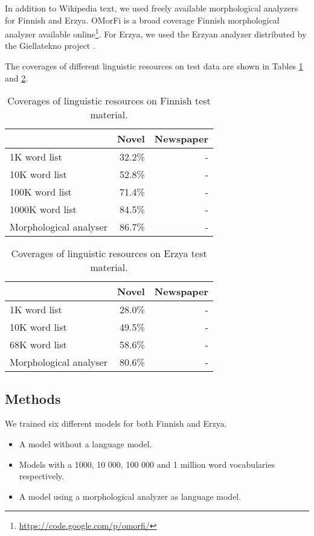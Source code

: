\documentclass[b5paper]{article}
\begin{document}
In addition to Wikipedia text, we used freely available morphological analyzers for Finnish and Erzya. OMorFi \cite{pirinen11} is a broad coverage Finnish morphological analyzer available online\footnote{\url{https://code.google.com/p/omorfi/}}. For Erzya, we used the Erzyan analyzer distributed by the Giellatekno project \cite{moshagen14}.

The coverages of different linguistic resources on test data are shown
in Tables \ref{fin-coverage} and \ref{myv-coverage}.

\begin{table}[!htb]
\begin{center}
\begin{tabular}{lrr}
\hline 
                        & Novel   & Newspaper \\
\hline 
1K word list            &  32.2\% &         - \\
10K word list           &  52.8\% &         - \\
100K word list          &  71.4\% &         - \\
1000K word list         &  84.5\% &         - \\
Morphological analyser  &  86.7\% &         - \\
\hline 
\end{tabular}
\caption{Coverages of linguistic resources on Finnish test material.}\label{fin-coverage}
\end{center}
\end{table}

\begin{table}[!htb]
\begin{center}
\begin{tabular}{lrr}
\hline 
                        & Novel     & Newspaper \\
\hline 
1K word list            &   28.0\%  &         - \\
10K word list           &   49.5\%  &         - \\
68K word list           &   58.6\%  &         - \\
Morphological analyser  &   80.6\%  &         - \\ 
\hline 
\end{tabular}
\caption{Coverages of linguistic resources on Erzya test material.}\label{myv-coverage}
\end{center}
\end{table}

\subsection{Methods}
We trained six different models for both Finnish and Erzya.
\begin{itemize}
\item A model without a language model.
\item Models with a 1000, 10 000, 100 000 and 1 million word vocabularies respectively.
\item A model using a morphological analyzer as language model.
\end{itemize}
\end{document}
